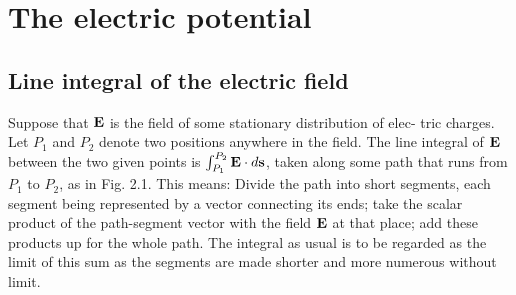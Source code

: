 \chapter{The electric potential}

\section{Line integral of the electric field}
Suppose that $\mathbf{E}$ is the field of some stationary distribution of elec-
tric charges. Let $P_1$ and $P_2$ denote two positions anywhere in the
field. The line integral of $\mathbf{E}$ between the two given points is 
$\int_{P_1}^{P_2}\mathbf{E}\cdot d\mathbf{s}$,
taken along some path that runs from $P_1$ to $P_2$, as in Fig. 2.1. This
means: Divide the path into short segments, each segment being
represented by a vector connecting its ends; take the scalar product
of the path-segment vector with the field $\mathbf{E}$ at that place; add these
products up for the whole path. The integral as usual is to be 
regarded as the limit of this sum as the segments are made shorter and
more numerous without limit.

